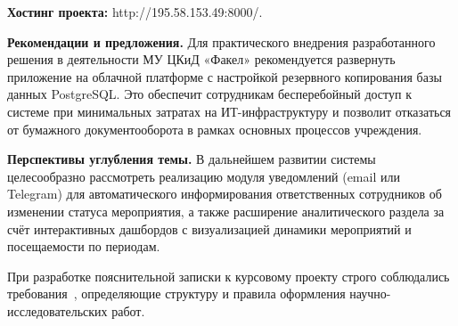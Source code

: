 \textbf{Хостинг проекта:} http://195.58.153.49:8000/.

\textbf{Рекомендации и предложения.} Для практического внедрения разработанного
решения в деятельности МУ ЦКиД «Факел» рекомендуется развернуть приложение на
облачной платформе с настройкой резервного копирования базы данных PostgreSQL.
Это обеспечит сотрудникам бесперебойный доступ к системе при минимальных затратах
на ИТ-инфраструктуру и позволит отказаться от бумажного документооборота в рамках
основных процессов учреждения.

\textbf{Перспективы углубления темы.} В дальнейшем развитии системы целесообразно
рассмотреть реализацию модуля уведомлений (email или Telegram) для автоматического
информирования ответственных сотрудников об изменении статуса мероприятия,
а также расширение аналитического раздела за счёт интерактивных дашбордов
с визуализацией динамики мероприятий и посещаемости по периодам.

При разработке пояснительной записки к курсовому проекту строго соблюдались
требования~\cite{gost_report}, определяющие структуру и правила оформления
научно-исследовательских работ.